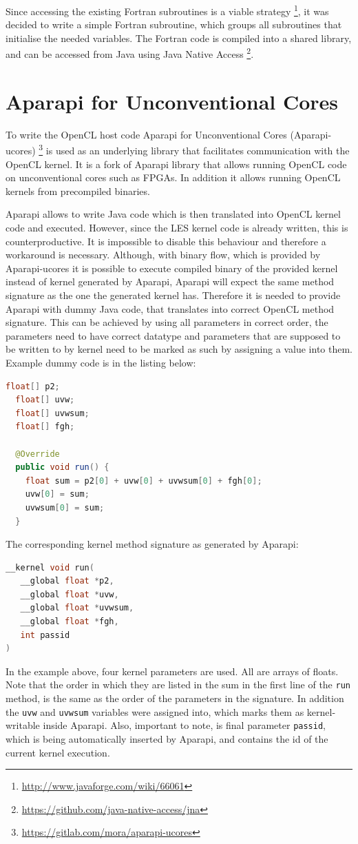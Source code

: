 \documentclass{l4proj}
\begin{document}
Since accessing the existing Fortran subroutines is a viable strategy
\footnote{\url{http://www.javaforge.com/wiki/66061}},
it was decided to write a simple Fortran subroutine, which groups 
all subroutines that initialise the needed variables. The Fortran code
is compiled into a shared library, and can be accessed from Java using
Java Native Access \footnote{\url{https://github.com/java-native-access/jna}}.

\section{Aparapi for Unconventional Cores}

To write the OpenCL host code Aparapi for Unconventional Cores (Aparapi-ucores)
\cite{aparapi_ucores}
\footnote{\url{https://gitlab.com/mora/aparapi-ucores}}
is used as an underlying library that facilitates communication
with the OpenCL kernel. It is a fork of Aparapi library that allows
running OpenCL code on unconventional cores such as FPGAs. In addition
it allows running OpenCL kernels from precompiled binaries.

Aparapi allows to write Java code which is then translated into OpenCL kernel code
and executed. However, since the LES kernel code is already written, this is 
counterproductive. It is impossible to disable this behaviour and therefore a 
workaround is necessary. Although, with binary flow, which is provided by Aparapi-ucores
it is possible to execute compiled binary of the provided kernel instead of 
kernel generated by Aparapi, Aparapi will expect the same method signature as 
the one the generated kernel has. Therefore it is needed to provide Aparapi with
dummy Java code, that translates into correct OpenCL method signature.
This can be achieved by using all parameters in correct order, the parameters
need to have correct datatype and parameters that are supposed to be written to
by kernel need to be marked as such by assigning a value into them. Example dummy
code is in the listing below:

\begin{lstlisting}[language=Java]
  float[] p2;
  float[] uvw;
  float[] uvwsum;
  float[] fgh;

  @Override
  public void run() {
    float sum = p2[0] + uvw[0] + uvwsum[0] + fgh[0];
    uvw[0] = sum;
    uvwsum[0] = sum;
  }
\end{lstlisting}
The corresponding kernel method signature as generated by Aparapi:
\begin{lstlisting}[language=C]
__kernel void run(
   __global float *p2, 
   __global float *uvw, 
   __global float *uvwsum, 
   __global float *fgh,
   int passid
)
\end{lstlisting}
In the example above, four kernel parameters are used. All are arrays of floats.
Note that the order in which they are listed in the sum in the first line of the 
\texttt{run} method, is the same as the order of the parameters in the signature.
In addition the \texttt{uvw} and \texttt{uvwsum} variables were assigned into,
which marks them as kernel-writable inside Aparapi. Also, important to note,
is final parameter \texttt{passid}, which is being automatically inserted by Aparapi,
and contains the id of the current kernel execution.
\end{document}
